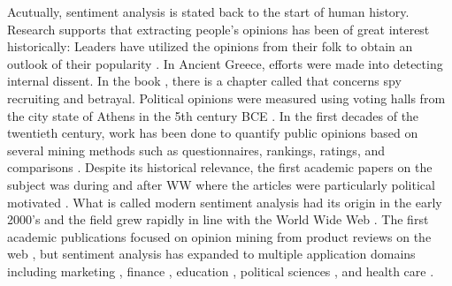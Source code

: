 Acutually, sentiment analysis is stated back to the start of human history. Research supports that extracting people's opinions has been of great interest historically: Leaders have utilized the opinions from their folk to obtain an outlook of their popularity \cite{SA-history-MANTYLA201816}. In Ancient Greece, efforts were made into detecting internal dissent. In the book , there is a chapter called  that concerns spy recruiting and betrayal. Political opinions were measured using voting halls from the city state of Athens in the 5th century BCE \cite{ATHEN-voting-thorley2012athenian}.  In the first decades of the twentieth century, work has been done to quantify public opinions based on several mining methods such as questionnaires, rankings, ratings, and comparisons \cite{mining-methods-droba1931methods}. Despite its historical relevance, the first academic papers on the subject was during and after WW\MakeUppercase{} where the articles were particularly political motivated \cite{SA-history-MANTYLA201816}. What is called modern sentiment analysis had its origin in the early 2000's and the field grew rapidly in line with the World Wide Web \cite{deep-learning-WIRE}. The first academic publications focused on opinion mining from product reviews on the web \cite{describe-polarity-dave2003mining}, but sentiment analysis has expanded to multiple application domains including marketing \cite{marketing-sa-rambocas2018online}, finance \cite{stock_price1}, education \cite{education_domain}, political sciences \cite{political-science-sa-rice2021corpus}, and health care \cite{healthcare-sa-gohil2018sentiment}. \\

